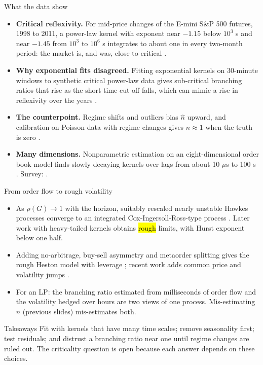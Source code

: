 \documentclass[aspectratio=169,10pt]{beamer}
\begin{document}
\begin{frame}{What the data show}
  \small
  \begin{itemize}
    \item \textbf{Critical reflexivity.} For mid-price changes of the E-mini S\&P 500 futures, 1998 to 2011, a power-law kernel with exponent near $-1.15$ below $10^3$ s and near $-1.45$ from $10^3$ to $10^6$ s integrates to about one in every two-month period: the market is, and was, close to critical \citep{hardiman2013critical}.
    \item \textbf{Why exponential fits disagreed.} Fitting exponential kernels on 30-minute windows to synthetic critical power-law data gives sub-critical branching ratios that rise as the short-time cut-off falls, which can mimic a rise in reflexivity over the years \citep{hardiman2013critical}.
    \item \textbf{The counterpoint.} Regime shifts and outliers bias $\hat n$ upward, and calibration on Poisson data with regime changes gives $n \approx 1$ when the truth is zero \citep{filimonov2015apparent}.
    \item \textbf{Many dimensions.} Nonparametric estimation on an eight-dimensional order book model finds slowly decaying kernels over lags from about 10 $\mu$s to 100 s \citep{bacry2016estimation}. Survey: \citet{bacry2015hawkes}.
  \end{itemize}
\end{frame}

\begin{frame}{From order flow to rough volatility}
  \small
  \begin{itemize}
    \item As $\rho(G) \to 1$ with the horizon, suitably rescaled nearly unstable Hawkes processes converge to an integrated Cox-Ingersoll-Ross-type process \citep{jaisson2015limit}. Later work with heavy-tailed kernels obtains \hl{rough} limits, with Hurst exponent below one half.
    \item Adding no-arbitrage, buy-sell asymmetry and metaorder splitting gives the rough Heston model with leverage \citep{eleuch2018microstructural}; recent work adds common price and volatility jumps \citep{wang2026rough}.
    \item For an LP: the branching ratio estimated from milliseconds of order flow and the volatility hedged over hours are two views of one process. Mis-estimating $n$ (previous slides) mis-estimates both.
  \end{itemize}
  \vspace{0.4em}
  \begin{alertblock}{Takeaways}
    \small
    Fit with kernels that have many time scales; remove seasonality first; test residuals; and distrust a branching ratio near one until regime changes are ruled out. The criticality question is open because each answer depends on these choices.
  \end{alertblock}
\end{frame}
\end{document}
